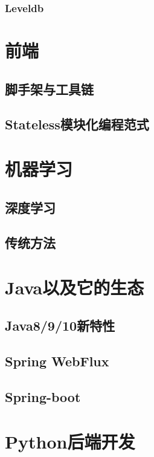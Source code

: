 \documentclass[11pt,oneside]{book}
\begin{document}
\subsection{Leveldb}


\chapter{前端}
\section{脚手架与工具链}
\lipsum[1-3]
\section{Stateless模块化编程范式}
\lipsum[1-3]


\chapter{机器学习}
\section{深度学习}
\lipsum[1-3]

\section{传统方法}
\lipsum[1-1]

\chapter{Java以及它的生态}
\section{Java8/9/10新特性}
\lipsum[1-2]
\section{Spring WebFlux}
\lipsum[1-2]
\section{Spring-boot}
\lipsum[1-2]

\chapter{Python后端开发}
\end{document}
